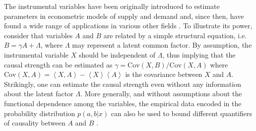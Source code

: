 \documentclass[letterpaper]{article}
\newcommand{\mean}[1]{\left\langle #1 \right\rangle}
\begin{document}
The instrumental variables have been originally introduced to estimate parameters
in econometric models of supply and demand \cite{economic} and, since then, have found a
wide range of applications in various other fields \cite{economic2, economic3}. To illustrate its
power, consider that variables $A$ and $B$ are related by a simple structural
equation, i.e. $B=\gamma A +\Lambda$, where $\Lambda$ may represent a latent common
factor. By assumption, the instrumental variable $X$ should be independent of
$\Lambda$, thus implying that the causal strength can be estimated as $\gamma=
\mathrm{Cov}(X,B)/\mathrm{Cov}(X,A)$ where $\mathrm{Cov}(X,A)= \mean{X,A} -
\mean{X}\mean{A}$ is the covariance between $X$ and $A$. Strikingly, one can
estimate the causal strength even without any information about the latent
factor $\Lambda$. More generally, and without assumptions about the functional
dependence among the variables, the empirical data encoded in the probability
distribution $p(a,b \vert x)$ can also be used to bound different quantifiers of
causality between $A$ and $B$ \cite{pearlbook,Janzing2013}.


\end{document}
